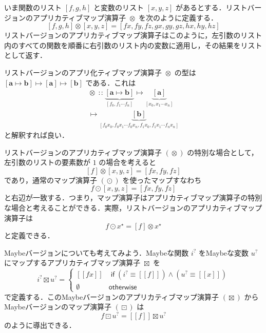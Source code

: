 \documentclass[a4paper,twocolumn]{jsbook}
\def\[{\left[\!\left[}
\def\]{\right]\!\right]}
\newcommand{\mKeyword}[1]{\mathsf{#1}} %
\newcommand{\mIfKeyword}{\mKeyword{if}}
\newcommand{\mOtherwiseKeyword}{\mKeyword{otherwise}}
\DeclareMathOperator{\mIf}{\mIfKeyword}
\DeclareMathOperator{\mOtherwise}{\mOtherwiseKeyword}
\newcommand{\mNothing}{\emptyset}
\DeclareMathOperator{\mAppMapList}{\otimes}
\DeclareMathOperator{\mAppMapMaybe}{\boxtimes}
\DeclareMathOperator{\mIn}{{:\!:}}
\DeclareMathOperator{\mLogicalAnd}{\wedge}
\DeclareMathOperator{\mMapList}{\odot}
\DeclareMathOperator{\mMapMaybe}{\boxdot}
\DeclareMathOperator{\mMapsTo}{\mapsto}
\newcommand{\mType}[1]{\mathbf{#1}}
\newcommand{\mListWith}[1]{\left[#1\right]}
\newcommand{\mMaybeWith}[1]{\[#1\]}
\newcommand{\mListType}[1]{\mListWith{\mType{#1}}}
\newcommand{\mList}[1]{{#1}^\mathrm{\star}}
\newcommand{\mMaybe}[1]{{#1}^\text{?}}
\newcommand{\mProj}[2]{#1\mMapsTo#2}
\begin{document}
いま関数のリスト $\mListWith{f,g,h}$ と変数のリスト $\mListWith{x,y,z}$ があるとする．リストバージョンのアプリカティブマップ演算子 $\mAppMapList$ を次のように定義する．
\begin{equation}
\mListWith{f,g,h}\mAppMapList\mListWith{x,y,z}
=\mListWith{fx,fy,fz,gx,gy,gz,hx,hy,hz}
\end{equation}
リストバージョンのアプリカティブマップ演算子はこのように，左引数のリスト内のすべての関数を順番に右引数のリスト内の変数に適用し，その結果をリストとして返す．

リストバージョンのアプリ化ティブマップ演算子 $\mAppMapList$ の型は $\mProj{\mListType{\mProj{\mType{a}}{\mType{b}}}}{\mProj{\mListType{\mType{a}}}{\mListType{\mType{b}}}}$ である．これは
\begin{multline}
\mAppMapList\mIn
\underbrace{\mListWith{\mType{a}\mapsto\mType{b}}}_{\mListWith{f_0,f_1\dotsb f_n}}
\mapsto
\underbrace{\mListType{a}}_{\mListWith{x_0,x_1\dotsb x_n}}\\
\mapsto
\underbrace{\mListType{\mType{b}}}_{\mListWith{f_0x_0,f_0x_1\dotsb f_0x_n,f_1x_0,f_1x_1\dotsb f_nx_n}}
\end{multline}
と解釈すれば良い．

リストバージョンのアプリカティブマップ演算子 $(\mAppMapList)$ の特別な場合として，左引数のリストの要素数が $1$ の場合を考えると
\begin{equation}
\mListWith{f}\mAppMapList\mListWith{x,y,z}
=\mListWith{fx,fy,fz}
\end{equation}
であり，通常のマップ演算子 $(\mMapList)$ を使ったマップすなわち
\begin{equation}
f\mMapList\mListWith{x,y,z}
=\mListWith{fx,fy,fz}
\end{equation}
と右辺が一致する．つまり，マップ演算子はアプリカティブマップ演算子の特別な場合と考えることができる．実際，リストバージョンのアプリカティブマップ演算子は
\begin{equation}
f\mMapList\mList{x}
=\mListWith{f}\mAppMapList\mList{x}
\end{equation}
と定義できる．

Maybeバージョンについても考えてみよう．Maybeな関数 $\mMaybe{i}$ をMaybeな変数 $\mMaybe{u}$ にマップするアプリカティブマップ演算子 $\mAppMapMaybe$ を
\begin{equation}
\mMaybe{i}\mAppMapMaybe\mMaybe{u}
=\begin{cases}
\mMaybeWith{fx}
&\mIf\left(\mMaybe{i}\equiv\mMaybeWith{f}\right)
\mLogicalAnd
\left(\mMaybe{u}\equiv\mMaybeWith{x}\right)\\
\mNothing&\mOtherwise
\end{cases}
\end{equation}
で定義する．このMaybeバージョンのアプリカティブマップ演算子 $(\mAppMapMaybe)$ からMaybeバージョンのマップ演算子 $(\mMapMaybe)$ は
\begin{equation}
f\mMapMaybe\mMaybe{u}
=\mMaybeWith{f}\mAppMapMaybe\mMaybe{u}
\end{equation}
のように導出できる．
\end{document}
